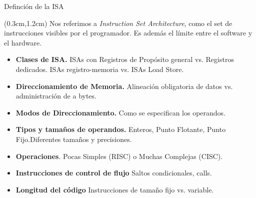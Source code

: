 \documentclass[table,dvipsnames,aspectratio=169]{beamer}
\begin{document}
\begin{frame}{Definción de la ISA}
 \begin{textblock*}{\textwidth}(0.3cm,1.2cm)
  \justifying Nos referimos a \textit{\color{blue}Instruction Set Architecture}, como el set de instrucciones visibles por el programador. Es además el límite entre el software y el hardware.
  \begin{itemize}[<+->] \justifying \parskip 0.1cm
  \small
   \item \textbf{\color{blue}Clases de ISA.} ISAs con Registros de Propósito general vs. Registros dedicados. ISAs registro-memoria vs. ISAs Load Store.
   \item \textbf{\color{blue}Direccionamiento de Memoria.} Alineación obligatoria de datos vs. administración de a bytes.
   \item \textbf{\color{blue}Modos de Direccionamiento.} Como se especifican los operandos.
   \item \textbf{\color{blue}Tipos y tamaños de operandos.} Enteros, Punto Flotante, Punto Fijo.Diferentes tamaños y precisiones.
   \item \textbf{\color{blue}Operaciones}. Pocas Simples (RISC) o Muchas Complejas (CISC).
   \item \textbf{\color{blue}Instrucciones de control de flujo} Saltos condicionales, calls.
   \item \textbf{\color{blue}Longitud del código} Instrucciones de tamaño fijo vs. variable.
  \end{itemize}
 \end{textblock*}
\end{frame}
\end{document}
